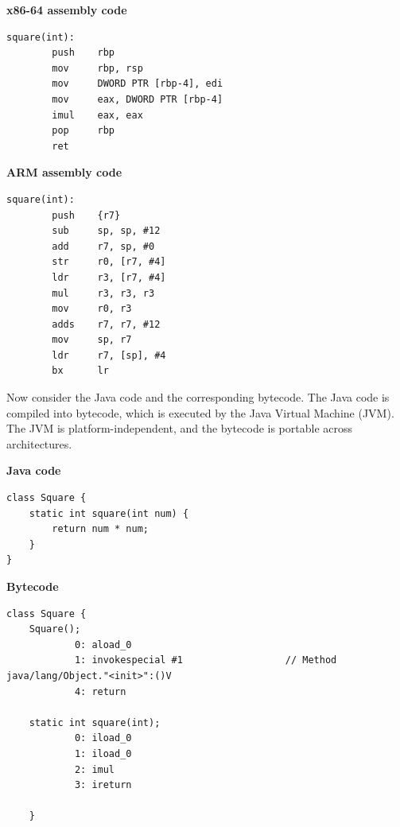 \documentclass[11pt,paper=a4,answers]{exam}
\begin{document}
\begin{adjustbox}{valign=t,minipage=0.52\textwidth}
    \textbf{x86-64 assembly code}
    \begin{lstlisting}[style=asmStyle]
        square(int):
        push    rbp
        mov     rbp, rsp
        mov     DWORD PTR [rbp-4], edi
        mov     eax, DWORD PTR [rbp-4]
        imul    eax, eax
        pop     rbp
        ret
    \end{lstlisting}
\end{adjustbox}
\hfill
\begin{adjustbox}{valign=t,minipage=0.42\textwidth}
    \textbf{ARM assembly code}
    \begin{lstlisting}[style=asmStyle]
        square(int):
        push    {r7}
        sub     sp, sp, #12
        add     r7, sp, #0
        str     r0, [r7, #4]
        ldr     r3, [r7, #4]
        mul     r3, r3, r3
        mov     r0, r3
        adds    r7, r7, #12
        mov     sp, r7
        ldr     r7, [sp], #4
        bx      lr
    \end{lstlisting}
\end{adjustbox}

Now consider the Java code and the corresponding bytecode. The Java code is compiled into bytecode, which is executed by the Java Virtual Machine (JVM). The JVM is platform-independent, and the bytecode is portable across architectures.

\begin{adjustbox}{valign=t,minipage=0.43\textwidth}
    \textbf{Java code}
    \begin{lstlisting}[style=javaStyle]
class Square {
    static int square(int num) {
        return num * num;
    }
}
    \end{lstlisting}
\end{adjustbox}
\hfill
\begin{adjustbox}{valign=t,minipage=0.52\textwidth}
    \textbf{Bytecode}
    \begin{lstlisting}[style=bytecodeStyle]
class Square {
    Square();
            0: aload_0
            1: invokespecial #1                  // Method java/lang/Object."<init>":()V
            4: return
    
    static int square(int);
            0: iload_0
            1: iload_0
            2: imul
            3: ireturn
    
    }
    \end{lstlisting}
\end{adjustbox}
\end{document}
